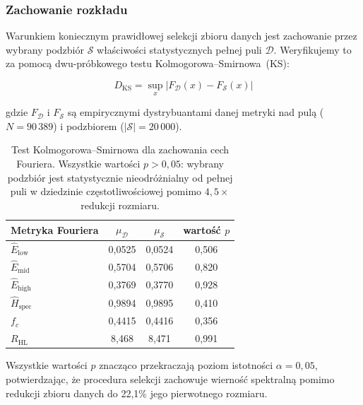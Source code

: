 \subsubsection{Zachowanie rozkładu}

Warunkiem koniecznym prawidłowej selekcji zbioru danych jest zachowanie przez
wybrany podzbiór $\mathcal{S}$ właściwości statystycznych pełnej puli
$\mathcal{D}$.  Weryfikujemy to za pomocą dwu-próbkowego testu
Kolmogorowa--Smirnowa~(KS):

\begin{equation}
    D_{\text{KS}} = \sup_x \bigl|F_{\mathcal{D}}(x) - F_{\mathcal{S}}(x)\bigr|
\end{equation}

gdzie $F_{\mathcal{D}}$ i $F_{\mathcal{S}}$ są empirycznymi dystrybuantami
danej metryki nad pulą ($N = 90\,389$) i podzbiorem
($|\mathcal{S}| = 20\,000$).

\begin{table}[h]
\centering
\caption{Test Kolmogorowa--Smirnowa dla zachowania cech Fouriera.
         Wszystkie wartości $p > 0{,}05$: wybrany podzbiór jest statystycznie
         nieodróżnialny od pełnej puli w dziedzinie częstotliwościowej pomimo
         $4{,}5\times$ redukcji rozmiaru.}
\label{tab:ks_fourier}
\begin{tabular}{lccc}
\toprule
\textbf{Metryka Fouriera} &
    $\mu_{\mathcal{D}}$ & $\mu_{\mathcal{S}}$ & wartość $p$ \\
\midrule
$\hat{E}_{\text{low}}$      & 0{,}0525 & 0{,}0524 & 0{,}506 \\
$\hat{E}_{\text{mid}}$      & 0{,}5704 & 0{,}5706 & 0{,}820 \\
$\hat{E}_{\text{high}}$     & 0{,}3769 & 0{,}3770 & 0{,}928 \\
$\hat{H}_{\text{spec}}$     & 0{,}9894 & 0{,}9895 & 0{,}410 \\
$f_c$                       & 0{,}4415 & 0{,}4416 & 0{,}356 \\
$R_{\text{HL}}$             & 8{,}468  & 8{,}471  & 0{,}991 \\
\bottomrule
\end{tabular}
\end{table}

Wszystkie wartości $p$ znacząco przekraczają poziom istotności
$\alpha = 0{,}05$, potwierdzając, że procedura selekcji zachowuje wierność
spektralną pomimo redukcji zbioru danych do 22{,}1\% jego pierwotnego
rozmiaru.


